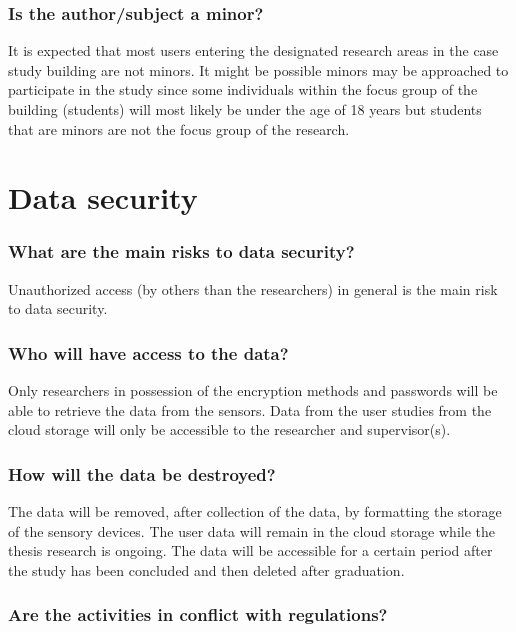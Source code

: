 \documentclass[a4paper]{article}
\begin{document}
\subsubsection{Is the author/subject a minor?}

It is expected that most users entering the designated research areas in the case study building are not minors. It might be possible minors may be approached to participate in the study since some individuals within the focus group of the building (students) will most likely be under the age of 18 years but students that are minors are not the focus group of the research.

\section{Data security}

\subsubsection{What are the main risks to data security?}

Unauthorized access (by others than the researchers) in general is the main risk to data security. 

\subsubsection{Who will have access to the data?}

Only researchers in possession of the encryption methods and passwords will be able to retrieve the data from the sensors. Data from the user studies from the cloud storage will only be accessible to the researcher and supervisor(s).

\subsubsection{How will the data be destroyed?}

The data will be removed, after collection of the data, by formatting the storage of the sensory devices. The user data will remain in the cloud storage while the thesis research is ongoing. The data will be accessible for a certain period after the study has been concluded and then deleted after graduation.

\subsubsection{Are the activities in conflict with regulations?}
\end{document}
